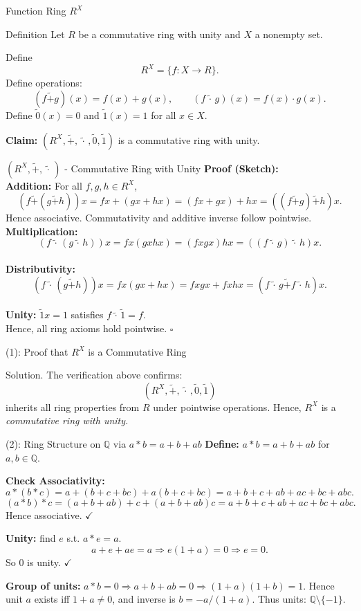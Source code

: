 \documentclass[11pt,aspectratio=43,ignorenonframetext,t]{beamer}
\begin{document}
\begin{frame}{Function Ring $R^X$}
\begin{block}{Definition}
    Let $R$ be a commutative ring with unity and $X$ a nonempty set.

Define
\[
R^X = \{ f : X \to R \}.
\]
Define operations:
\[
(f \tilde{+} g)(x) = f(x) + g(x), \qquad (f \, \tilde{\cdot}\,  g)(x) = f(x)\cdot g(x).
\]
Define $\tilde{0}(x)=0$ and $\tilde{1}(x)=1$ for all $x\in X$.

\textbf{Claim:} $(R^X, \tilde{+}, \, \tilde{\cdot}\, , \tilde{0}, \tilde{1})$ is a commutative ring with unity.
\end{block}
\end{frame}

\begin{frame}{$(R^X, \tilde{+}, \, \tilde{\cdot}\, )$ - Commutative Ring with Unity}
\textbf{Proof (Sketch):}\\
\textbf{Addition:} For all $f,g,h\in R^X$,
  \[
  (f\tilde{+}(g\tilde{+}h))x = fx + (gx+hx) = (fx+gx)+hx = ((f\tilde{+}g)\tilde{+}h)x.
  \]
  Hence associative. Commutativity and additive inverse follow pointwise.\\
  \textbf{Multiplication:}
  \[
  (f\, \tilde{\cdot}\, (g\, \tilde{\cdot}\, h))x = fx(gxhx) = (fxgx)hx = ((f\, \tilde{\cdot}\, g)\, \tilde{\cdot}\, h)x.
  \]
  \\ \textbf{Distributivity:}
  \[
  (f\, \tilde{\cdot}\, (g\tilde{+}h))x=fx(gx+hx)=fxgx+fxhx=(f\, \tilde{\cdot}\, g\tilde{+}f\, \tilde{\cdot}\, h)x.
  \]
  \\ \textbf{Unity:} $\tilde{1}x=1$ satisfies $f\, \tilde{\cdot}\, \tilde{1}=f$.\\

Hence, all ring axioms hold pointwise. $\square$
\end{frame}


\begin{frame}{(1): Proof that $R^X$ is a Commutative Ring}
\begin{block}{Solution.}
The verification above confirms:
\[
(R^X, \tilde{+}, \, \tilde{\cdot}\, , \tilde{0}, \tilde{1})
\]
inherits all ring properties from $R$ under pointwise operations.  
Hence, $R^X$ is a \emph{commutative ring with unity.}
\end{block}
\end{frame}

\begin{frame}{(2): Ring Structure on $\mathbb{Q}$ via $a*b=a+b+ab$}
\textbf{Define:} $a*b=a+b+ab$ for $a,b\in\mathbb{Q}$.

\textbf{Check Associativity:}
\[
a*(b*c) = a+(b+c+bc)+a(b+c+bc) = a+b+c+ab+ac+bc+abc.
\]
\[
(a*b)*c = (a+b+ab)+c+(a+b+ab)c = a+b+c+ab+ac+bc+abc.
\]
Hence associative. $\checkmark$

\textbf{Unity:} find $e$ s.t. $a*e=a$.  
\[
a+e+ae=a \Rightarrow e(1+a)=0 \Rightarrow e=0.
\]
So $0$ is unity. $\checkmark$

\textbf{Group of units:}  
$a*b=0 \Rightarrow a+b+ab=0 \Rightarrow (1+a)(1+b)=1$.  
Hence unit $a$ exists iff $1+a\ne0$, and inverse is $b=-a/(1+a)$.  
Thus units: $\mathbb{Q}\setminus\{-1\}.$
\end{frame}
\end{document}
